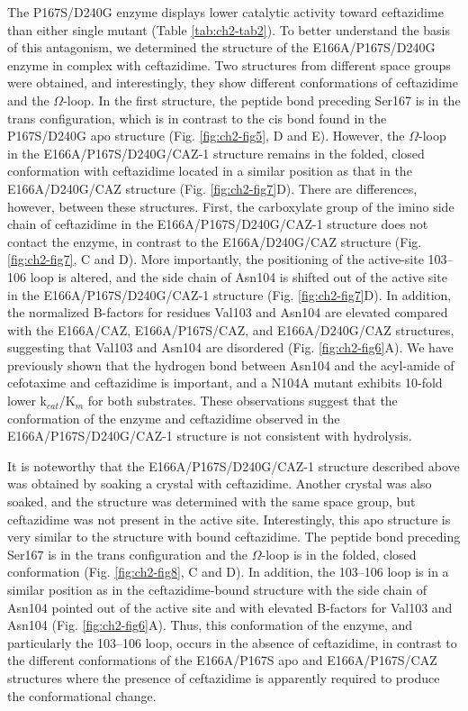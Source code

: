 \documentclass[../main.tex]{subfiles}
\begin{document}
        The P167S/D240G enzyme displays lower catalytic activity toward ceftazidime than either single mutant (Table \ref{tab:ch2-tab2}). To better understand the basis of this antagonism, we determined the structure of the E166A/P167S/D240G enzyme in complex with ceftazidime. Two structures from different space groups were obtained, and interestingly, they show different conformations of ceftazidime and the $\Omega$-loop. In the first structure, the peptide bond preceding Ser167 is in the trans configuration, which is in contrast to the cis bond found in the P167S/D240G apo structure (Fig. \ref{fig:ch2-fig5}, D and E). However, the $\Omega$-loop in the E166A/P167S/D240G/CAZ-1 structure remains in the folded, closed conformation with ceftazidime located in a similar position as that in the E166A/D240G/CAZ structure (Fig. \ref{fig:ch2-fig7}D). There are differences, however, between these structures. First, the carboxylate group of the imino side chain of ceftazidime in the E166A/P167S/D240G/CAZ-1 structure does not contact the enzyme, in contrast to the E166A/D240G/CAZ structure (Fig. \ref{fig:ch2-fig7}, C and D). More importantly, the positioning of the active-site 103–106 loop is altered, and the side chain of Asn104 is shifted out of the active site in the E166A/P167S/D240G/CAZ-1 structure (Fig. \ref{fig:ch2-fig7}D). In addition, the normalized B-factors for residues Val103 and Asn104 are elevated compared with the E166A/CAZ, E166A/P167S/CAZ, and E166A/D240G/CAZ structures, suggesting that Val103 and Asn104 are disordered (Fig. \ref{fig:ch2-fig6}A). We have previously shown that the hydrogen bond between Asn104 and the acyl-amide of cefotaxime and ceftazidime is important, and a N104A mutant exhibits 10-fold lower k$_{cat}$/K$_{m}$ for both substrates\cite{patel_synergistic_2018}. These observations suggest that the conformation of the enzyme and ceftazidime observed in the E166A/P167S/D240G/CAZ-1 structure is not consistent with hydrolysis.

        It is noteworthy that the E166A/P167S/D240G/CAZ-1 structure described above was obtained by soaking a crystal with ceftazidime. Another crystal was also soaked, and the structure was determined with the same space group, but ceftazidime was not present in the active site. Interestingly, this apo structure is very similar to the structure with bound ceftazidime. The peptide bond preceding Ser167 is in the trans configuration and the $\Omega$-loop is in the folded, closed conformation (Fig. \ref{fig:ch2-fig8}, C and D). In addition, the 103–106 loop is in a similar position as in the ceftazidime-bound structure with the side chain of Asn104 pointed out of the active site and with elevated B-factors for Val103 and Asn104 (Fig. \ref{fig:ch2-fig6}A). Thus, this conformation of the enzyme, and particularly the 103–106 loop, occurs in the absence of ceftazidime, in contrast to the different conformations of the E166A/P167S apo and E166A/P167S/CAZ structures where the presence of ceftazidime is apparently required to produce the conformational change.
\end{document}
